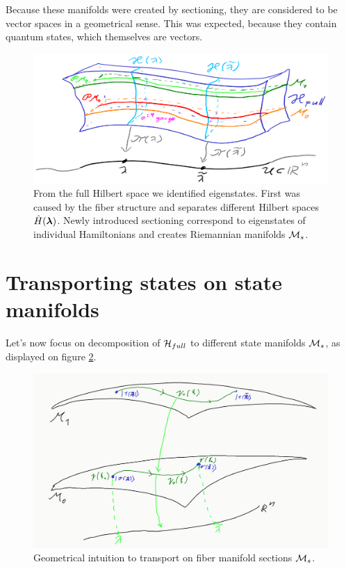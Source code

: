 Because these manifolds were created by sectioning, they are considered to be vector spaces in a geometrical sense. This was expected, because they contain quantum states, which themselves are vectors.

\begin{figure}[H]
    \centering
    \includegraphics[width=\textwidth]{../img/manifold_full_1.png}
\caption{From the full Hilbert space we identified eigenstates. First was caused by the fiber structure and separates different Hilbert spaces $\hat{H}({\bm\lambda})$. Newly introduced sectioning correspond to eigenstates of individual Hamiltonians and creates Riemannian manifolds $\mathcal{M}_s$.}
    \label{fig:fullStructure}
\end{figure}






\section{Transporting states on state manifolds}
Let's now focus on decomposition of $\mathcal{H}_{full}$ to different state manifolds $\mathcal{M}_s$, as displayed on figure \ref{fig:manifoldCutIntuition}.

\begin{figure}[h]
    \centering
    \includegraphics[width=\textwidth]{../img/manifoldCutIntuition.png}
\caption{Geometrical intuition to transport on fiber manifold sections $\mathcal{M}_s$.}
    \label{fig:manifoldCutIntuition}
\end{figure}

